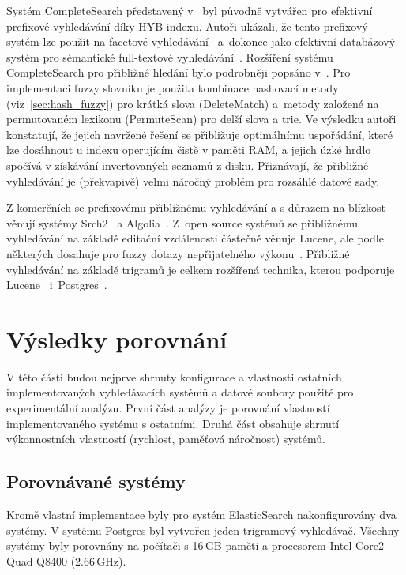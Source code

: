 \documentclass[11pt,letterpaper,oneside,openright]{book}
\begin{document}
Systém CompleteSearch představený v~\cite{Bast:2006:TLF:1148170.1148234} byl
původně vytvářen pro efektivní prefixové vyhledávání díky HYB indexu. Autoři
ukázali, že tento prefixový systém lze použít na facetové
vyhledávání~\cite{Bast_abstractwhen} a~dokonce jako efektivní databázový systém
pro sémantické full-textové vyhledávání~\cite{Bast:2007:EES:1277741.1277856}.
Rozšíření systému CompleteSearch pro přibližné hledání bylo podrobněji popsáno
v~\cite{Bast:2013:EFS:2457465.2457470}. Pro implementaci fuzzy slovníku je
použita kombinace hashovací metody (viz~\ref{sec:hash_fuzzy}) pro krátká slova
(DeleteMatch) a~metody založené na permutovaném lexikonu (PermuteScan) pro
delší slova a trie. Ve výsledku autoři konstatují, že jejich navržené řešení se
přibližuje optimálnímu uspořádání, které lze dosáhnout u indexu operujícím
čistě v paměti RAM, a jejich úzké hrdlo spočívá v získávání invertovaných
seznamů z disku. Přiznávají, že přibližné vyhledávání je (překvapivě) velmi
náročný problém pro rozsáhlé datové sady.

Z komerčních se prefixovému přibližnému vyhledávání a s důrazem na blízkost
věnují systémy Srch2~\cite{srch2_website} a Algolia~\cite{algolia_website}.
Z~open source systémů se přibližnému vyhledávání na základě editační
vzdálenosti částečně věnuje Lucene, ale podle některých dosahuje pro fuzzy
dotazy nepřijatelného
výkonu~\cite{Bast:2013:EFS:2457465.2457470,algolia_vs_elasticsearch}. Přibližné
vyhledávání na základě trigramů je celkem rozšířená technika, kterou podporuje
Lucene~\cite{lucene_website} i~Postgres~\cite{postgres_website}.


\chapter{Výsledky porovnání} \label{sec:results}
V této části budou nejprve shrnuty konfigurace a vlastnosti ostatních
implementovaných vyhledávacích systémů a datové soubory použité pro
experimentální analýzu.  První část analýzy je porovnání vlastností
implementovaného systému s ostatními. Druhá část obsahuje shrnutí výkonnostních
vlastností (rychlost, paměťová náročnost) systémů.

\section{Porovnávané systémy}
Kromě vlastní implementace byly pro systém ElasticSearch nakonfigurovány
dva systémy. V systému Postgres byl vytvořen jeden trigramový
vyhledávač. Všechny systémy byly porovnány na počítači s 16\,GB paměti a
procesorem Intel Core2 Quad Q8400 (2.66\,GHz).
\end{document}

